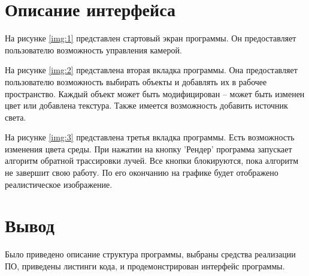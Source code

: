 \section{Описание интерфейса}

На рисунке \ref{img:1} представлен стартовый экран программы. Он предоставляет пользователю возможность управления камерой.


На рисунке \ref{img:2} представлена вторая вкладка программы. Она предоставляет пользователю возможность выбирать объекты и добавлять их в рабочее пространство. Каждый объект может быть модифицирован -- может быть изменен цвет или добавлена текстура. Также имеется возможность добавить источник света.


На рисунке \ref{img:3} представлена третья вкладка программы. Есть возможность изменения цвета среды.
При нажатии на кнопку ’Рендер’ программа запускает алгоритм обратной трассировки лучей. 
Все кнопки блокируются, пока алгоритм не завершит свою работу. По его окончанию на графике будет отображено реалистическое изображение.

\newpage
\section{Вывод}
Было приведено описание структура программы, выбраны средства реализации ПО, приведены листинги кода, и продемонстрирован интерфейс программы.